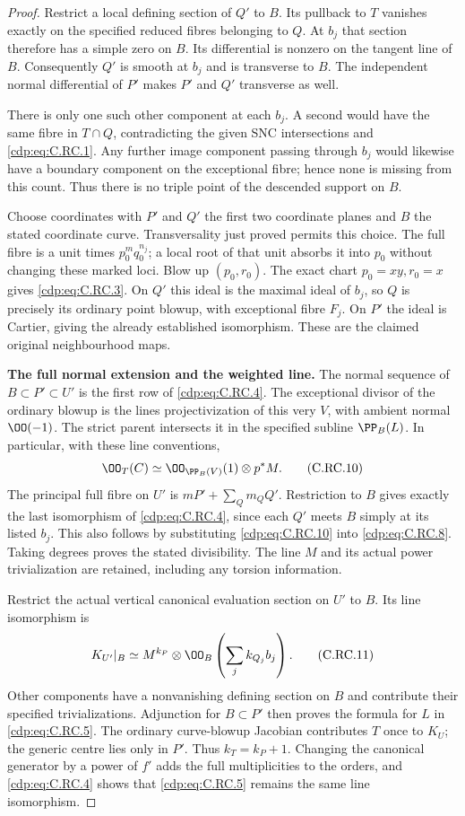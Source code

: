 \begin{proof}
Restrict a local defining section of
$Q'$ to $B$. Its pullback to $T$
vanishes exactly on the specified
reduced fibres belonging to $Q$.
At $b_j$ that section therefore
has a simple zero on $B$. Its
differential is nonzero on the
tangent line of $B$. Consequently
$Q'$ is smooth at $b_j$ and is
transverse to $B$. The independent
normal differential of $P'$ makes
$P'$ and $Q'$ transverse as well.

There is only one such other
component at each $b_j$. A second
would have the same fibre in
$T\cap Q$, contradicting the
given SNC intersections and
\eqref{cdp:eq:C.RC.1}. Any further image
component passing through $b_j$
would likewise have a boundary
component on the exceptional
fibre; hence none is missing
from this count. Thus there is
no triple point of the descended
support on $B$.

Choose coordinates with $P'$ and
$Q'$ the first two coordinate
planes and $B$ the stated
coordinate curve. Transversality
just proved permits this choice.
The full fibre is a unit times
$p_0^m q_0^{n_j}$; a local root
of that unit absorbs it into
$p_0$ without changing these
marked loci. Blow up $(p_0,r_0)$.
The exact chart $p_0=xy,r_0=x$
gives \eqref{cdp:eq:C.RC.3}. On $Q'$ this
ideal is the maximal ideal
of $b_j$, so $Q$ is precisely
its ordinary point blowup,
with exceptional fibre $F_j$.
On $P'$ the ideal is Cartier,
giving the already established
isomorphism. These are the
claimed original neighbourhood
maps.

\par\medskip\noindent\textbf{The full normal extension and the weighted line.}
The normal sequence of
$B\subset P'\subset U'$
is the first row of \eqref{cdp:eq:C.RC.4}.
The exceptional divisor of
the ordinary blowup is the
lines projectivization of
this very $V$, with
ambient normal $\OO(-1)$.
The strict parent intersects
it in the specified subline
$\PP_B(L)$. In particular,
with these line conventions,
\[
                 \OO_T(C)\simeq
                      \OO_{\PP_B(V)}(1)\otimes p^*M.
\tag{C.RC.10}\label{cdp:eq:C.RC.10}
\]
The principal full fibre on
$U'$ is $mP'+\sum_Qm_QQ'$.
Restriction to $B$ gives
exactly the last isomorphism
of \eqref{cdp:eq:C.RC.4}, since each
$Q'$ meets $B$ simply at
its listed $b_j$. This
also follows by substituting
\eqref{cdp:eq:C.RC.10} into \eqref{cdp:eq:C.RC.8}.
Taking degrees proves the
stated divisibility. The
line $M$ and its actual
power trivialization are
retained, including any
torsion information.

Restrict the actual vertical
canonical evaluation section
on $U'$ to $B$. Its line
isomorphism is
\[
 K_{U'}|_B\simeq
       M^{k_P}\otimes
             \OO_B\left(\sum_jk_{Q_j}b_j\right).
\tag{C.RC.11}\label{cdp:eq:C.RC.11}
\]
Other components have a
nonvanishing defining section
on $B$ and contribute their
specified trivializations.
Adjunction for $B\subset P'$
then proves the formula for
$L$ in \eqref{cdp:eq:C.RC.5}. The
ordinary curve-blowup
Jacobian contributes $T$
once to $K_U$; the generic
centre lies only in $P'$.
Thus $k_T=k_P+1$.
Changing the canonical
generator by a power of $f'$
adds the full multiplicities
to the orders, and \eqref{cdp:eq:C.RC.4}
shows that \eqref{cdp:eq:C.RC.5} remains
the same line isomorphism.


\end{proof}
